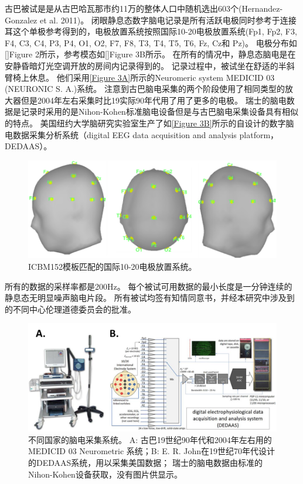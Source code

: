 古巴被试是是从古巴哈瓦那市约11万的整体人口中随机选出603个\citing{}(Hernandez-Gonzalez et al. 2011)。 闭眼静息态数字脑电记录是所有活跃电极同时参考于连接耳这个单极参考得到的，电极放置系统按照国际10-20电极放置系统(Fp1, Fp2, F3, F4, C3, C4, P3, P4, O1, O2, F7, F8, T3, T4, T5, T6, Fz, Cz和 Pz)。 电极分布如\ref{}Figure 2所示，参考模态如\ref{}Figure 3B所示。 在所有的情况中，静息态脑电是在安静昏暗灯光空调开放的房间内记录得到的。 记录过程中，被试坐在舒适的半斜臂椅上休息。 他们采用\ref{Figure 3A}所示的Neuromeric system MEDICID 03 (NEURONIC S. A.)系统。 注意到古巴脑电采集的两个阶段使用了相同类型的放大器但是2004年左右采集时比19实际90年代用了用了更多的电极。 瑞士的脑电数据是记录时采用的是Nihon-Kohen标准脑电设备但是与古巴脑电采集设备具有相似的特点。 美国纽约大学脑研究实验室生产了如\ref{Figure 3B}所示的自设计的数字脑电数据采集分析系统（digital EEG data acquisition and analysis platform，DEDAAS）。
\begin{figure}
\includegraphics[width=15cm]{pic/Norm/figure2.png}
\caption{ICBM152模板匹配的国际10-20电极放置系统。}
\label{fig2}
\end{figure}
所有的数据的采样率都是200Hz。 每个被试可用数据的最小长度是一分钟连续的静息态无明显噪声脑电片段。 所有被试均签有知情同意书，并经本研究中涉及到的不同中心伦理道德委员会的批准。
\begin{figure}
\includegraphics[width=15cm]{pic/Norm/figure3.png}
\caption{不同国家的脑电采集系统。 A: 古巴19世纪90年代和2004年左右用的MEDICID 03 Neurometric 系统；B: E. R. John在19世纪70年代设计的DEDAAS系统，用以采集美国数据； 瑞士的脑电数据由标准的Nihon-Kohen设备获取，没有图片供显示。}
\label{fig3}
\end{figure}

